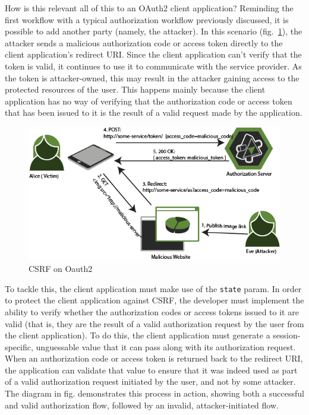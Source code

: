How is this relevant all of this to an OAuth2 client application? 
Reminding the first workflow with a typical authorization workflow previously discussed, it is possible to add another party (namely, the attacker). In this scenario (fig.~\ref{fig:csrf}), the attacker sends a malicious authorization code or access token directly to the client application's redirect URI. Since the client application can't verify that the token is valid, it continues to use it to communicate with the service provider. As the token is attacker-owned, this may result in the attacker gaining access to the protected resources of the user.
This happens mainly because the client application has no way of verifying that the authorization code or access token that has been issued to it is the result of a valid request made by the application.

\vspace{1.5cm}

\begin{figure}[h!]
    \centering
    \includegraphics[scale=0.65]{chapters/images/chp4/csrf.png}
    \caption{CSRF on Oauth2}
    \label{fig:csrf}
\end{figure}

\vspace{1.5cm}

To tackle this, the client application must make use of the \texttt{state} param.
In order to protect the client application against CSRF, the developer must implement the ability to verify whether the authorization codes or access tokens issued to it are valid (that is, they are the result of a valid authorization request by the user from the client application). To do this, the client application must generate a session-specific, unguessable value that it can pass along with its authorization request. When an authorization code or access token is returned back to the redirect URI, the application can validate that value to ensure that it was indeed used as part of a valid authorization request initiated by the user, and not by some attacker.
The diagram in fig. demonstrates this process in action, showing both a successful and valid authorization flow, followed by an invalid, attacker-initiated flow.

